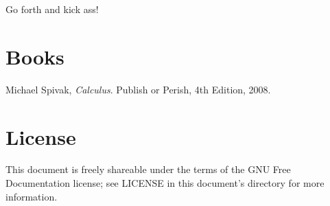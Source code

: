\documentclass{article}
\begin{document}
Go forth and kick ass!

\section{Books}

\begin{thebibliography}{9}

  Michael Spivak,
  \emph{Calculus}.
  Publish or Perish,
  4th Edition,
  2008.

\end{thebibliography}

\section{License}

This document is freely shareable under the terms of the GNU Free Documentation
license; see LICENSE in this document's directory for more information.
\end{document}
